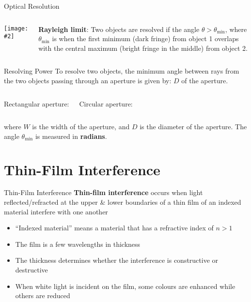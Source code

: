 \documentclass[12pt,compress,aspectratio=169]{beamer}
\newcommand{\pic}[2]{\texttt{[image: \#2]}}
\newcommand{\eq}[2]{\vspace{#1}{\LARGE\begin{displaymath}#2\end{displaymath}}}
\begin{document}
\begin{frame}{Optical Resolution}
  \begin{columns}
    \pic{1}{graphics/resolve4.png}

    \textbf{Rayleigh limit}: Two objects are resolved if the angle
      $\theta>\theta_\mathrm{min}$, where $\theta_\mathrm{min}$ is when the first
      minimum (dark fringe) from object 1 overlaps with the central maximum
      (bright fringe in the middle) from object 2.
  \end{columns}
\end{frame}


\begin{frame}{Resolving Power}
  To resolve two objects, the minimum angle between rays from the two objects
  passing through an aperture is given by:
  $D$ of the aperture.
  \vspace{0.2in}
  \begin{columns}
    Rectangular aperture:

    \eq{-.2in}{
      \boxed{\theta_\mathrm{min}=\frac{\lambda}{W}}
    }
    Circular aperture:

    \eq{-.2in}{
      \boxed{\theta_\mathrm{min}=\frac{1.22\lambda}{D}}
    }
  \end{columns}
  where $W$ is the width of the aperture, and $D$ is the diameter of the
  aperture. The angle $\theta_\mathrm{min}$ is measured in \textbf{radians}.
\end{frame}


\section{Thin-Film Interference}

\begin{frame}{Thin-Film Interference}
  \textbf{Thin-film interference} occurs when light reflected/refracted at
  the upper \& lower boundaries of a thin film of an indexed material interfere
  with one another
  \begin{itemize}
  \item ``Indexed material'' means a material that has a refractive index of
    $n>1$
  \item The film is a few wavelengths in thickness
  \item The thickness determines whether the interference is constructive or
    destructive
  \item When white light is incident on the film, some colours are enhanced
    while others are reduced
  \end{itemize}
\end{frame}
\end{document}
